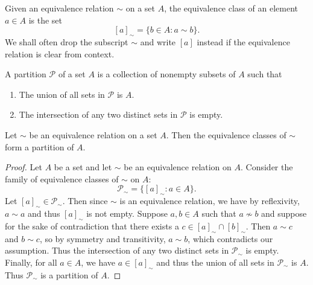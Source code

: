 \begin{definition}
    Given an equivalence relation \(\sim\) on a set \(A\), the equivalence class
    of an element \(a \in A\) is the set
    \[
        [a]_{\sim} = \{b \in A : a \sim b\}.
    \]
    We shall often drop the subscript \(\sim\) and write \([a]\) instead if the
    equivalence relation is clear from context.
\end{definition}

\begin{definition}
    A partition \(\mathcal{P}\) of a set \(A\) is a collection of nonempty
    subsets of \(A\) such that
    \begin{enumerate}[label=(\alph*)]
        \item The union of all sets in \(\mathcal{P}\) is \(A\).
        \item The intersection of any two distinct sets in \(\mathcal{P}\) is
        empty.
    \end{enumerate}
\end{definition}

\begin{theorem}
    Let \(\sim\) be an equivalence relation on a set \(A\). Then the equivalence
    classes of \(\sim\) form a partition of \(A\).
\end{theorem}

\begin{proof}
    Let \(A\) be a set and let \(\sim\) be an equivalence relation on \(A\).
    Consider the family of equivalence classes of \(\sim\) on \(A\):
    \[
        \mathcal{P}_{\sim} = \{[a]_{\sim} : a \in A\}.
    \]
    Let \([a]_{\sim} \in \mathcal{P}_{\sim}\). Then since \(\sim\) is an
    equivalence relation, we have by reflexivity, \(a \sim a\) and thus
    \([a]_{\sim}\) is not empty. Suppose \(a, b \in A\) such that \(a\not\sim
    b\) and suppose for the sake of contradiction that there exists a \(c \in
    [a]_{\sim} \cap [b]_{\sim}\). Then \(a \sim c\) and \(b \sim c\), so by
    symmetry and transitivity, \(a \sim b\), which contradicts our assumption.
    Thus the intersection of any two distinct sets in \(\mathcal{P}_{\sim}\) is
    empty. Finally, for all \(a \in A\), we have \(a \in [a]_{\sim}\) and thus
    the union of all sets in \(\mathcal{P}_{\sim}\) is \(A\). Thus
    \(\mathcal{P}_{\sim}\) is a partition of \(A\).
\end{proof}


